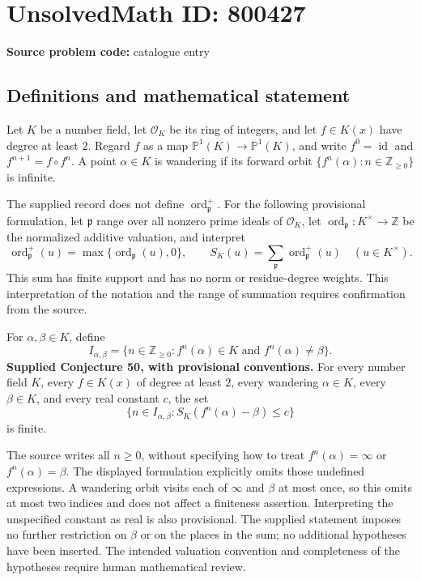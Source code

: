 \documentclass[11pt]{article}
\newcommand{\Z}{\mathbb{Z}}
\newcommand{\PP}{\mathbb{P}}
\begin{document}
\section*{UnsolvedMath ID: 800427}
\textbf{Source problem code:} catalogue entry
\subsection{Definitions and mathematical statement}
Let $K$ be a number field, let $\mathcal O_K$ be its ring of integers, and let $f\in K(x)$ have degree at least $2$. Regard $f$ as a map $\PP^1(K)\to\PP^1(K)$, and write $f^0=\operatorname{id}$ and $f^{n+1}=f\circ f^n$. A point $\alpha\in K$ is wandering if its forward orbit $\{f^n(\alpha):n\in\Z_{\ge0}\}$ is infinite.

The supplied record does not define $\operatorname{ord}_{\mathfrak p}^{+}$. For the following provisional formulation, let $\mathfrak p$ range over all nonzero prime ideals of $\mathcal O_K$, let $\operatorname{ord}_{\mathfrak p}:K^\times\to\Z$ be the normalized additive valuation, and interpret
\[
\operatorname{ord}_{\mathfrak p}^{+}(u)=\max\{\operatorname{ord}_{\mathfrak p}(u),0\},\qquad
S_K(u)=\sum_{\mathfrak p}\operatorname{ord}_{\mathfrak p}^{+}(u)
\quad(u\in K^\times).
\]
This sum has finite support and has no norm or residue-degree weights. This interpretation of the notation and the range of summation requires confirmation from the source.

For $\alpha,\beta\in K$, define
\[
I_{\alpha,\beta}=\{n\in\Z_{\ge0}:f^n(\alpha)\in K\text{ and }f^n(\alpha)\ne\beta\}.
\]
\textbf{Supplied Conjecture 50, with provisional conventions.} For every number field $K$, every $f\in K(x)$ of degree at least $2$, every wandering $\alpha\in K$, every $\beta\in K$, and every real constant $c$, the set
\[
\{n\in I_{\alpha,\beta}:S_K(f^n(\alpha)-\beta)\le c\}
\]
is finite.

The source writes all $n\ge0$, without specifying how to treat $f^n(\alpha)=\infty$ or $f^n(\alpha)=\beta$. The displayed formulation explicitly omits those undefined expressions. A wandering orbit visits each of $\infty$ and $\beta$ at most once, so this omits at most two indices and does not affect a finiteness assertion. Interpreting the unspecified constant as real is also provisional. The supplied statement imposes no further restriction on $\beta$ or on the places in the sum; no additional hypotheses have been inserted. The intended valuation convention and completeness of the hypotheses require human mathematical review.
\end{document}
